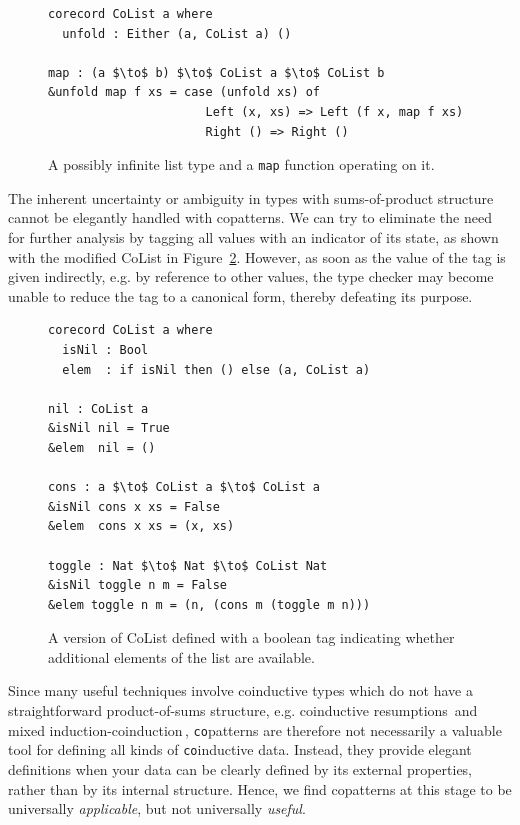 \begin{figure}[h]
\begin{lstlisting}[mathescape]
corecord CoList a where
  unfold : Either (a, CoList a) ()

map : (a $\to$ b) $\to$ CoList a $\to$ CoList b 
&unfold map f xs = case (unfold xs) of
                      Left (x, xs) => Left (f x, map f xs)
                      Right () => Right ()
\end{lstlisting}
  \caption{A possibly infinite list type and a \texttt{map} function operating on it.}
  \label{fig:colist}
\end{figure}

The inherent uncertainty or ambiguity in types with sums-of-product structure
cannot be elegantly handled with copatterns. We can try to eliminate the need
for further analysis by tagging all values with an indicator of its state, as
shown with the modified CoList in Figure~\ref{fig:dependent_colist}. However, as
soon as the value of the tag is given indirectly, e.g. by reference to other values,
the type checker may become unable to reduce the tag to a canonical form, thereby
defeating its purpose.

\begin{figure}[h]
\begin{lstlisting}[mathescape]
corecord CoList a where
  isNil : Bool
  elem  : if isNil then () else (a, CoList a)

nil : CoList a
&isNil nil = True
&elem  nil = ()

cons : a $\to$ CoList a $\to$ CoList a
&isNil cons x xs = False
&elem  cons x xs = (x, xs)

toggle : Nat $\to$ Nat $\to$ CoList Nat
&isNil toggle n m = False
&elem toggle n m = (n, (cons m (toggle m n)))
\end{lstlisting}
\caption{A version of CoList defined with a boolean tag indicating whether
  additional elements of the list are available.}
\label{fig:dependent_colist}
\end{figure}

Since many useful techniques involve coinductive types which do not have a
straightforward product-of-sums structure, e.g. coinductive
resumptions\,\citep{Pirog2014273} and mixed
induction-coinduction\,\citep{Danielsson09mixinginduction}, \texttt{co}patterns
are therefore not necessarily a valuable tool for defining all kinds of
\texttt{co}inductive data. Instead, they provide elegant definitions when your data can be
clearly defined by its external properties, rather than by its internal
structure. Hence, we find copatterns at this stage to be universally \emph{applicable}, but not
universally \emph{useful}.


